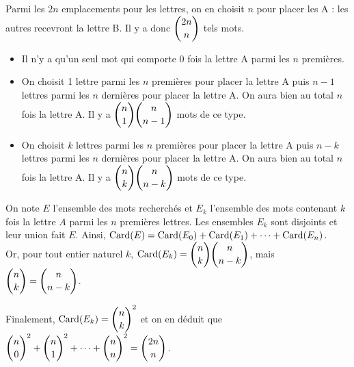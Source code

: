 \documentclass[11pt,fleqn, openany]{book} %
\begin{document}
\begin{solution}Parmi les $2n$ emplacements pour les lettres, on en choisit $n$ pour placer les A : les autres recevront la lettre B. Il y a donc $\dbinom{2n}{n}$ tels mots.

\begin{itemize}
\item Il n'y a qu'un seul mot qui comporte 0 fois la lettre A parmi les $n$ premières.
\item On choisit 1 lettre parmi les $n$ premières pour placer la lettre A puis $n-1$ lettres parmi les $n$ dernières pour placer la lettre A. On aura bien au total $n$ fois la lettre A. Il y a $\dbinom{n}{1}\dbinom{n}{n-1}$ mots de ce type.
\item On choisit $k$ lettres parmi les $n$ premières pour placer la lettre A puis $n-k$ lettres parmi les $n$ dernières pour placer la lettre A. On aura bien au total $n$ fois la lettre A. Il y a $\dbinom{n}{k}\dbinom{n}{n-k}$ mots de ce type.
\end{itemize}

On note $E$ l'ensemble des mots recherchés et $E_k$ l'ensemble des mots contenant $k$ fois la lettre $A$ parmi les $n$ premières lettres. Les ensembles $E_k$ sont disjoints et leur union fait $E$. Ainsi, $\mathrm{Card}(E)=\mathrm{Card}(E_0)+\mathrm{Card}(E_1)+\dots + \mathrm{Card}(E_n)$. \\Or, pour tout entier naturel $k$, $\mathrm{Card}(E_k)=\dbinom{n}{k}\dbinom{n}{n-k}$, mais $\dbinom{n}{k}=\dbinom{n}{n-k}$. 

Finalement, $\mathrm{Card}(E_k)=\dbinom{n}{k}^2$ et on en déduit que  $\dbinom{n}{0}^2+\dbinom{n}{1}^2+\dots+\dbinom{n}{n}^2=\dbinom{2n}{n}$.\end{solution}
\end{document}

